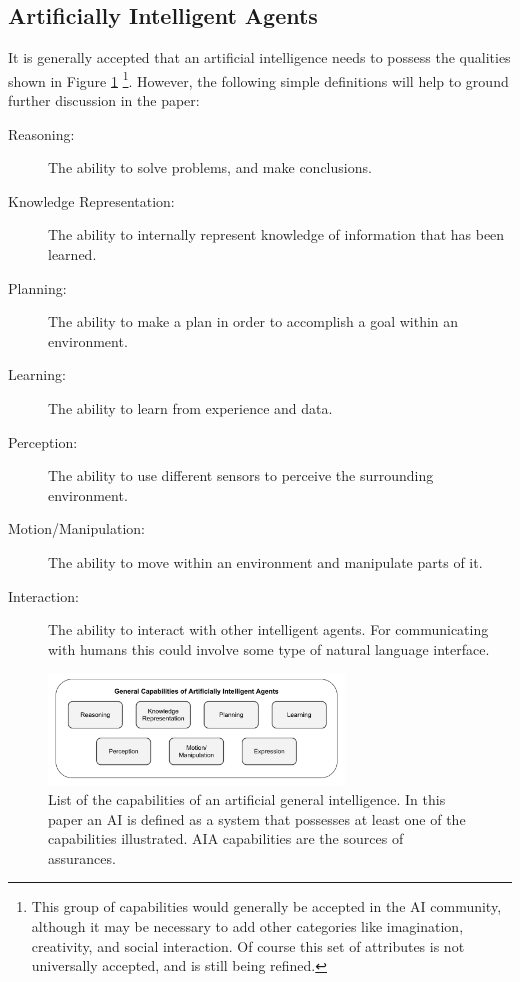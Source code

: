 \subsection{Artificially Intelligent Agents} \label{sec:aias}
    It is generally accepted that an artificial intelligence needs to possess the qualities shown in Figure \ref{fig:AIcapabilities} \cite{Russell2010-wv,Nilsson2009-rp,Luger2008-vf}\footnote{This group of capabilities would generally be accepted in the AI community, although it may be necessary to add other categories like imagination, creativity, and social interaction. Of course this set of attributes is not universally accepted, and is still being refined.}. However, the following simple definitions will help to ground further discussion in the paper:

    \begin{description}
        \item [Reasoning:] The ability to solve problems, and make conclusions.
        \item [Knowledge Representation:] The ability to internally represent knowledge of information that has been learned.
        \item [Planning:] The ability to make a plan in order to accomplish a goal within an environment.
        \item [Learning:] The ability to learn from experience and data.
        \item [Perception:] The ability to use different sensors to perceive the surrounding environment.
        \item [Motion/Manipulation:] The ability to move within an environment and manipulate parts of it.
        \item [Interaction:] The ability to interact with other intelligent agents. For communicating with humans this could involve some type of natural language interface.
    \end{description}

	\begin{figure}[htbp]
    	\centering
     	\includegraphics[width=0.7\textwidth]{Figures/AI_capabilities}
    	\caption{List of the capabilities of an artificial general intelligence. In this paper an AI is defined as a system that possesses at least one of the capabilities illustrated. AIA capabilities are the sources of assurances.}
        \label{fig:AIcapabilities}
    \end{figure}

